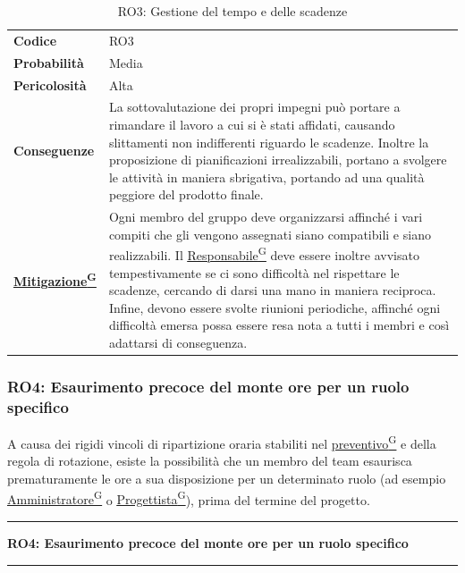 \documentclass[a4paper,12pt]{article}
\providecommand{\glslink}[2]{\href{https://alittlebyte-19.github.io/Documentazione/glossario.html\#gls-#1}{\underline{#2}\textsuperscript{\scriptsize G}}}
\begin{document}
\begin{table}[h]
\begin{tabular}{>{\bfseries}p{3cm} | p{12.2cm}}
Codice & RO3 \\

Probabilità & Media\\

Pericolosità & Alta\\

Conseguenze & La sottovalutazione dei propri impegni può portare a rimandare il lavoro a cui si è stati affidati, causando slittamenti non indifferenti riguardo le scadenze.
Inoltre la proposizione di pianificazioni irrealizzabili, portano a svolgere le attività in maniera sbrigativa, portando ad una qualità peggiore del prodotto finale. \\

\glslink{mitigazione-dei-rischi}{Mitigazione} & Ogni membro del gruppo deve organizzarsi affinché i vari compiti che gli vengono assegnati siano compatibili e siano realizzabili. Il \glslink{responsabile}{Responsabile} deve
essere inoltre avvisato tempestivamente se ci sono difficoltà nel rispettare le scadenze, cercando di darsi una mano in maniera reciproca. Infine, devono essere svolte riunioni periodiche, affinché ogni difficoltà emersa possa essere resa nota a tutti i membri e così adattarsi di conseguenza.\\
\end{tabular}
\caption{RO3: Gestione del tempo e delle scadenze}
\end{table}
\newpage

\subsubsection{RO4: Esaurimento precoce del monte ore per un ruolo specifico}
A causa dei rigidi vincoli di ripartizione oraria stabiliti nel \glslink{preventivo}{preventivo} e della regola di rotazione, esiste la possibilità che un membro del team esaurisca prematuramente le ore a sua disposizione per un determinato ruolo (ad esempio \glslink{amministratore}{Amministratore} o \glslink{progettista}{Progettista}), prima del termine del progetto.

\vspace{0.5cm}
\hrule
\vspace{0.5em}
\textbf{RO4: Esaurimento precoce del monte ore per un ruolo specifico}
\vspace{0.5em}
\hrule
\vspace{1cm}
\end{document}
